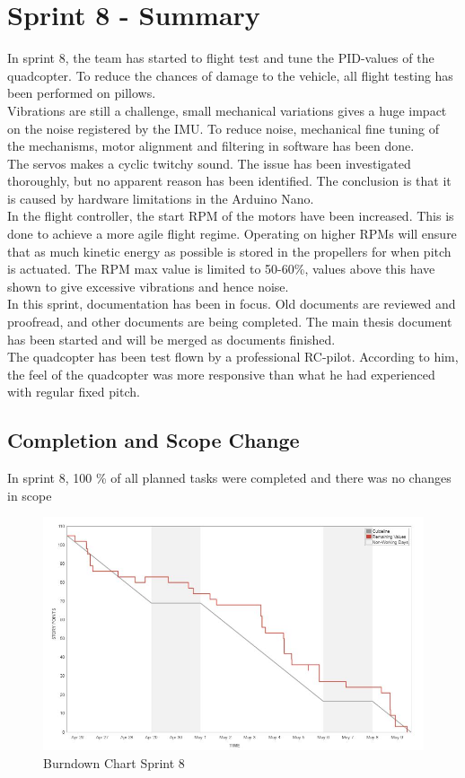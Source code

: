 \chapter{Sprint 8 - Summary}

In sprint 8, the team has started to flight test and tune the PID-values of the quadcopter. To reduce the chances of damage to the vehicle, all flight testing has been performed on pillows. 
\\
Vibrations are still a challenge, small mechanical variations gives a huge impact on the noise registered by the IMU. To reduce noise, mechanical fine tuning of the mechanisms, motor alignment and filtering in software has been done. 
\\
The servos makes a cyclic twitchy sound. The issue has been investigated thoroughly, but no apparent reason has been identified. The conclusion is that it is caused by hardware limitations in the Arduino Nano.
\\
In the flight controller, the start RPM of the motors have been increased. This is done to achieve a more agile flight regime. Operating on higher RPMs will ensure that as much kinetic energy as possible is stored in the propellers for when pitch is actuated. The RPM max value is limited to 50-60\%, values above this have shown to give excessive vibrations and hence noise.
\\
In this sprint, documentation has been in focus. Old documents are reviewed and proofread, and other documents are being completed. The main thesis document has been started and will be merged as documents finished.
\\
The quadcopter has been test flown by a professional RC-pilot. According to him, the feel of the quadcopter was more responsive than what he had experienced with regular fixed pitch.

\section{Completion and Scope Change}

In sprint 8, 100 \% of all planned tasks were completed and there was no changes in scope

\begin{figure}[H]
    \centering
         \includegraphics[width = 1\textwidth]{VAPIQ-PICTURES/BDSprint8}
      \caption{Burndown Chart Sprint 8}
    \label{fig:bds8}
\end{figure} 

